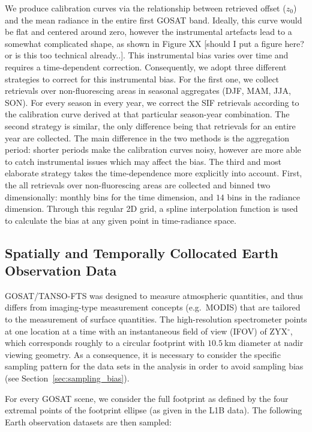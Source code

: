 \documentclass[preprint, a4paper, 10pt, times]{elsarticle}
\begin{document}
We produce calibration curves via the relationship between retrieved offset ($z_0$) and the mean radiance in the entire first GOSAT band. Ideally, this curve would be flat and centered around zero, however the instrumental artefacts lead to a somewhat complicated shape, as shown in Figure XX [should I put a figure here? or is this too technical already..]. This instrumental bias varies over time and requires a time-dependent correction. Consequently, we adopt three different strategies to correct for this instrumental bias. For the first one, we collect retrievals over non-fluorescing areas in seasonal aggregates (DJF, MAM, JJA, SON). For every season in every year, we correct the SIF retrievals according to the calibration curve derived at that particular season-year combination. The second strategy is similar, the only difference being that retrievals for an entire year are collected. The main difference in the two methods is the aggregation period: shorter periods make the calibration curves noisy, however are more able to catch instrumental issues which may affect the bias. The third and most elaborate strategy takes the time-dependence more explicitly into account. First, the all retrievals over non-fluorescing areas are collected and binned two dimensionally: monthly bins for the time dimension, and $14$ bins in the radiance dimension. Through this regular 2D grid, a spline interpolation function is used to calculate the bias at any given point in time-radiance space.  


\subsection{Spatially and Temporally Collocated Earth Observation Data}
\label{sec:collocation}

GOSAT/TANSO-FTS was designed to measure atmospheric quantities, and thus differs from imaging-type measurement concepts (e.g.~MODIS) that are tailored to the measurement of surface quantities. The high-resolution spectrometer points at one location at a time with an instantaneous field of view (IFOV) of ZYX$^\circ$, which corresponds roughly to a circular footprint with $10.5\:\mathrm{km}$ diameter at nadir viewing geometry. As a consequence, it is necessary to consider the specific sampling pattern for the data sets in the analysis in order to avoid sampling bias (see Section~\ref{sec:sampling_bias}).

For every GOSAT scene, we consider the full footprint as defined by the four extremal points of the footprint ellipse (as given in the L1B data). The following Earth observation datasets are then sampled:
\end{document}
